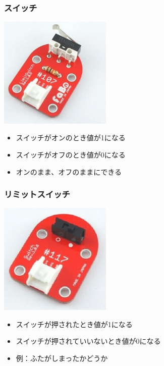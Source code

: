 \begin{frame}
    \frametitle{スイッチ}
    \begin{center}
        \includegraphics[width=0.4\textwidth]{images/chap05/text05-img020.jpg}
        \begin{itemize}
            \item スイッチがオンのとき値が1になる
            \item スイッチがオフのとき値が0になる
            \item オンのまま、オフのままにできる
        \end{itemize}
    \end{center}
\end{frame}

\begin{frame}
    \frametitle{リミットスイッチ}
    \begin{center}
        \includegraphics[width=0.4\textwidth]{images/chap05/text05-img019.jpg}
        \begin{itemize}
            \item スイッチが押されたとき値が1になる
            \item スイッチが押されていいないとき値が0になる
            \item 例：ふたがしまったかどうか
        \end{itemize}
    \end{center}
\end{frame}

